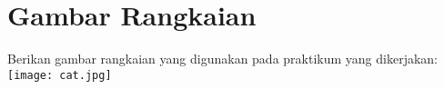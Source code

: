 \chapter{Gambar Rangkaian}

Berikan gambar rangkaian yang digunakan pada praktikum yang dikerjakan:\\
\texttt{[image: cat.jpg]}